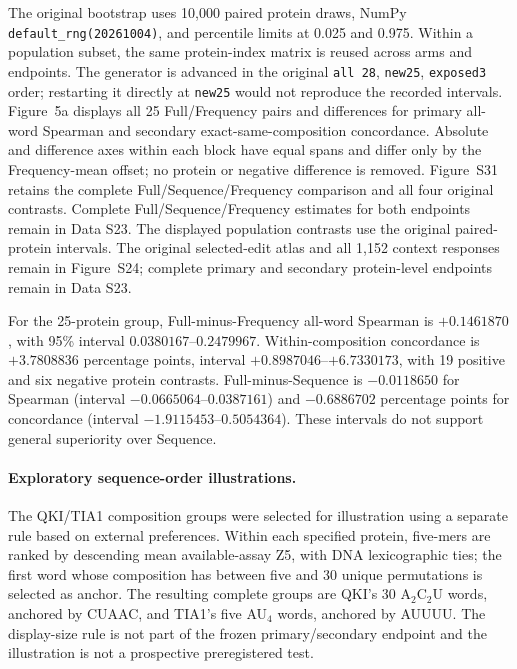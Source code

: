 \documentclass[11pt]{article}
\begin{document}
The original bootstrap uses 10,000 paired protein draws, NumPy \texttt{default\_rng(20261004)}, and percentile limits at 0.025 and 0.975. Within a population subset, the same protein-index matrix is reused across arms and endpoints. The generator is advanced in the original \texttt{all 28}, \texttt{new25}, \texttt{exposed3} order; restarting it directly at \texttt{new25} would not reproduce the recorded intervals. Figure~5a displays all 25 Full/Frequency pairs and differences for primary all-word Spearman and secondary exact-same-composition concordance. Absolute and difference axes within each block have equal spans and differ only by the Frequency-mean offset; no protein or negative difference is removed. Figure~S31 retains the complete Full/Sequence/Frequency comparison and all four original contrasts. Complete Full/Sequence/Frequency estimates for both endpoints remain in Data S23. The displayed population contrasts use the original paired-protein intervals. The original selected-edit atlas and all 1,152 context responses remain in Figure~S24; complete primary and secondary protein-level endpoints remain in Data S23.

For the 25-protein group, Full-minus-Frequency all-word Spearman is \(+0.1461870\), with 95\% interval \(0.0380167\)--\(0.2479967\). Within-composition concordance is \(+3.7808836\) percentage points, interval \(+0.8987046\)--\(+6.7330173\), with 19 positive and six negative protein contrasts. Full-minus-Sequence is \(-0.0118650\) for Spearman (interval \(-0.0665064\)--\(0.0387161\)) and \(-0.6886702\) percentage points for concordance (interval \(-1.9115453\)--\(0.5054364\)). These intervals do not support general superiority over Sequence.

\paragraph{Exploratory sequence-order illustrations.}
The QKI/TIA1 composition groups were selected for illustration using a separate rule based on external preferences. Within each specified protein, five-mers are ranked by descending mean available-assay Z5, with DNA lexicographic ties; the first word whose composition has between five and 30 unique permutations is selected as anchor. The resulting complete groups are QKI's 30 A\(_2\)C\(_2\)U words, anchored by CUAAC, and TIA1's five AU\(_4\) words, anchored by AUUUU. The display-size rule is not part of the frozen primary/secondary endpoint and the illustration is not a prospective preregistered test.
\end{document}
